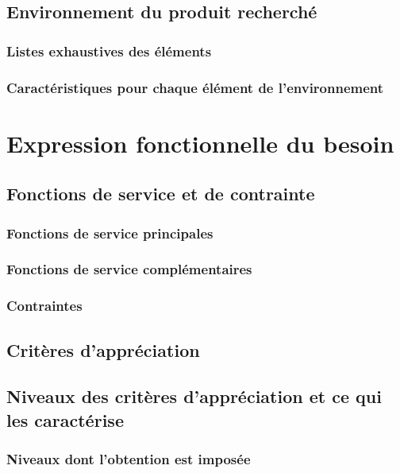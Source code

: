 \documentclass[10pt,a4paper]{article}
\begin{document}
\subsection{Environnement du produit recherché}
\subsubsection{Listes exhaustives des éléments} 
\subsubsection{Caractéristiques pour chaque élément de l’environnement}

\section{Expression fonctionnelle du besoin}

\subsection{Fonctions de service et de contrainte}
\subsubsection{Fonctions de service principales}
\subsubsection{Fonctions de service complémentaires}
\subsubsection{Contraintes}

\subsection{Critères d’appréciation}

\subsection{Niveaux des critères d’appréciation et ce qui les caractérise}
\subsubsection{Niveaux dont l’obtention est imposée}
\end{document}
